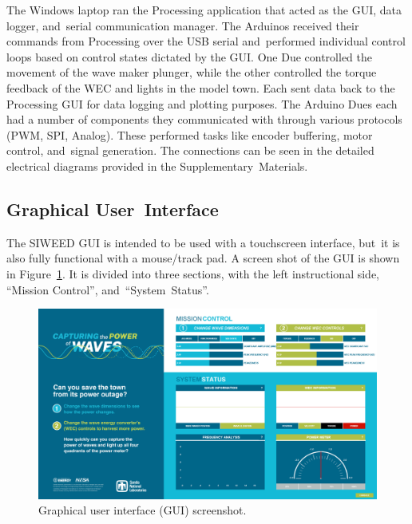 \documentclass[hardware,article,submit,pdftex,moreauthors]{Definitions/mdpi}
\begin{document}
The Windows laptop ran the Processing application that acted as the GUI, data logger, and~serial communication manager.
The Arduinos received their commands from Processing over the USB serial and~performed individual control loops based on control states dictated by the GUI.
One Due controlled the movement of the wave maker plunger, while the other controlled the torque feedback of the WEC and lights in the model town.
Each sent data back to the Processing GUI for data logging and plotting purposes.
The Arduino Dues each had a number of components they communicated with through various protocols (PWM, SPI, Analog).
These performed tasks like encoder buffering, motor control, and~signal generation.
The connections can be seen in the detailed electrical diagrams provided in the Supplementary~Materials.

\subsection{Graphical User~Interface}
The SIWEED GUI is intended to be used with a touchscreen interface, but~it is also fully functional with a mouse/track pad.
A screen shot of the GUI is shown in Figure~\ref{fig:siweed_guiScreenShot}.
It is divided into three sections, with the left instructional side, ``Mission Control'', and~``System~Status''.





\begin{figure}[H]
  \centering
  \includegraphics[width=1\textwidth]{diagrams/siweed_guiScreenShot.png}
  \caption{Graphical user interface (GUI) screenshot.}
  \label{fig:siweed_guiScreenShot}
\end{figure}
\end{document}
